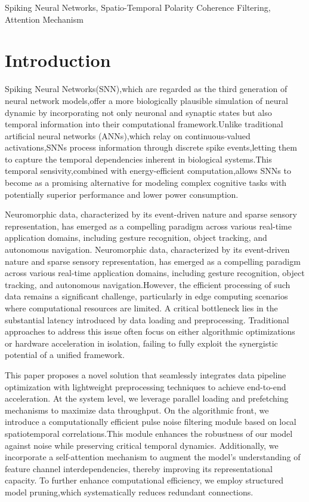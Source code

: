 \documentclass[conference]{IEEEtran}
\begin{document}
\begin{IEEEkeywords}
Spiking Neural Networks, Spatio-Temporal Polarity Coherence Filtering, Attention Mechanism
\end{IEEEkeywords}

\section{Introduction}
Spiking Neural Networks(SNN),which are regarded as the third generation of neural network models,offer a more biologically plausible simulation of neural dynamic by incorporating not only neuronal and synaptic states but also temporal information into their computational framework.\cite{b3,10.5555}Unlike traditional artificial neural networks (ANNs),which relay on continuous-valued activations,SNNs process information through discrete spike events,letting them to capture the temporal dependencies inherent in biological systems.This temporal sensivity,combined with energy-efficient computation,allows SNNs to become as a promising alternative for modeling complex cognitive tasks with potentially superior performance and lower power consumption.\cite{roy2019towards}

Neuromorphic data, characterized by its event-driven nature and sparse sensory representation, has emerged as a compelling paradigm across various real-time application domains, including gesture recognition, object tracking, and autonomous navigation. Neuromorphic data, characterized by its event-driven nature and sparse sensory representation, has emerged as a compelling paradigm across various real-time application domains, including gesture recognition, object tracking, and autonomous navigation.However, the efficient processing of such data remains a significant challenge, particularly in edge computing scenarios where computational resources are limited. A critical bottleneck lies in the substantial latency introduced by data loading and preprocessing. Traditional approaches to address this issue often focus on either algorithmic optimizations or hardware acceleration in isolation, failing to fully exploit the synergistic potential of a unified framework.\cite{ding2024}

This paper proposes a novel solution that seamlessly integrates data pipeline optimization with lightweight preprocessing techniques to achieve end-to-end acceleration. At the system level, we leverage parallel loading and prefetching mechanisms to maximize data throughput. On the algorithmic front, we introduce a computationally efficient pulse noise filtering module based on local spatiotemporal correlations.This module enhances the robustness of our model against noise while preserving critical temporal dynamics. Additionally, we incorporate a self-attention mechanism to augment the model's understanding of feature channel interdependencies, thereby improving its representational capacity.\cite{hu2019} To further enhance computational efficiency, we employ structured model pruning,which systematically reduces redundant connections.\cite{han2015}
\end{document}
